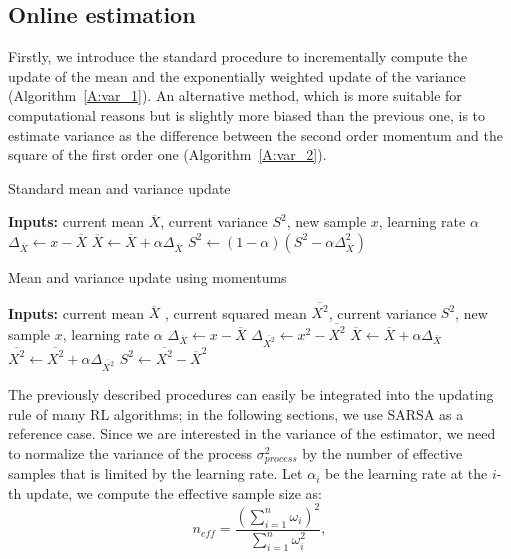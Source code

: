 \subsection{Online estimation}
Firstly, we introduce the standard procedure to incrementally compute the update of the mean and the exponentially weighted update of the variance (Algorithm~\ref{A:var_1}). An alternative method, which is more suitable for computational reasons but is slightly more biased than the previous one, is to estimate variance as the difference between the second order momentum and the square of the first order one (Algorithm~\ref{A:var_2}).
\begin{algorithm}[t]
 \caption{Standard mean and variance update}
 \begin{algorithmic}[1]\label{A:var_1}
  \STATE \textbf{Inputs:} current mean $\overline{X}$, current variance $S^2$, new sample $x$, learning rate $\alpha$
  \STATE $\Delta_{\overline{X}} \gets x - \overline{X}$
  \STATE $\overline{X} \gets \overline{X} + \alpha \Delta_{\overline{X}}$
  \STATE $S^2 \gets (1 - \alpha)(S^2 - \alpha \Delta_{\overline{X}}^2)$
 \end{algorithmic}
\end{algorithm}
\begin{algorithm}[t]
 \caption{Mean and variance update using momentums}
 \begin{algorithmic}[1]\label{A:var_2}
  \STATE \textbf{Inputs:} current mean $\overline{X}$ , current squared mean $\overline{X^2}$, current variance $S^2$, new sample $x$, learning rate $\alpha$
  \STATE $\Delta_{\overline{X}} \gets x - \overline{X}$
  \STATE $\Delta_{\overline{X^2}} \gets x^2 - \overline{X^2}$
  \STATE $\overline{X} \gets \overline{X} + \alpha \Delta_{\overline{X}}$
  \STATE $\overline{X^2} \gets \overline{X^2} + \alpha \Delta_{\overline{X^2}}$
  \STATE $S^2 \gets \overline{X^2} - \overline{X}^2$
 \end{algorithmic}
\end{algorithm}
The previously described procedures can easily be integrated into the updating rule of many RL algorithms; in the following sections, we use SARSA as a reference case. Since we are interested in the variance of the estimator, we need to normalize the variance of the process $\sigma^2_{process}$ by the number of effective samples that is limited by the learning rate. Let $\alpha_i$ be the learning rate at the $i$-th update, we compute the effective sample size as:
\begin{equation}
 n_{eff} = \frac{(\sum_{i=1}^n \omega_i)^2}{\sum_{i=1}^n \omega_i^2},
\end{equation}
